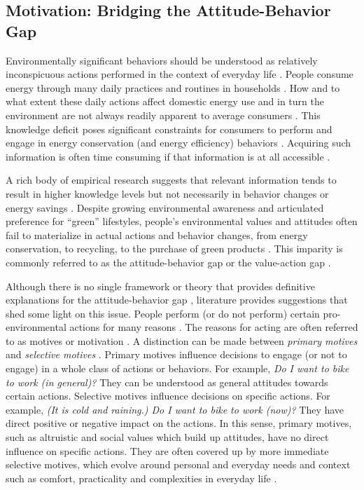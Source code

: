 \subsection{Motivation: Bridging the Attitude-Behavior Gap}

Environmentally significant behaviors should be understood as relatively inconspicuous actions performed in the context of everyday life \citep{Burgess2008}. People consume energy through many daily practices and routines in households \citep{Burgess2008,Hargreaves2010, Fehrenbacher2011,Burchell2014}. How and to what extent these daily actions affect domestic energy use and in turn the environment are not always readily apparent to average consumers  \citep{Burgess2008,Delmas2013}. This knowledge deficit poses significant constraints for consumers to perform and engage in energy conservation (and energy efficiency) behaviors \citep{Schultz2002,Burchell2014}. Acquiring such information is often time consuming if that information is at all accessible \citep{Delmas2013}. 

A rich body of empirical research suggests that relevant information tends to result in higher knowledge levels but not necessarily in behavior changes or energy savings  \citep{Abrahamse2005,Delmas2013,Burchell2014,Asensio2015}. Despite growing environmental awareness and articulated preference for ``green'' lifestyles, people's environmental values and attitudes often fail to materialize in actual actions and behavior changes, from energy conservation, to recycling,  to the purchase of green products  \citep{Schultz2002,Abrahamse2005,Claudy2013}. This imparity is commonly referred to as the attitude-behavior gap or the value-action gap  \citep{Blake1999,Kollmuss2002,Claudy2013}. 

Although there is no single framework or theory that provides definitive explanations for the attitude-behavior gap  \citep{Kollmuss2002,Schultz2014}, literature provides suggestions that shed some light on this issue. People perform (or do not perform) certain pro-environmental actions for many reasons  \citep{Schultz2002}. The reasons for acting are often referred to as motives or motivation  \citep{Parfit1997,Moisander2007}. A distinction can be made between \textit{primary motives} and \textit{selective motives}  \citep{Kollmuss2002,Moisander2007}. Primary motives influence decisions to engage (or not to engage) in a whole class of actions or behaviors. For example, \textit{Do I want to bike to work (in general)?} They can be understood as general attitudes towards certain actions. Selective motives influence decisions on specific actions. For example, \textit{(It is cold and raining.) Do I want to bike to work (now)?} They have direct positive or negative impact on the actions. In this sense, primary motives, such as altruistic and social values which build up attitudes, have no direct influence on specific actions. They are often covered up by more immediate selective motives, which evolve around personal and everyday needs and context such as comfort, practicality and complexities in everyday life  \citep{Kollmuss2002,Berthou2013,Selvefors2015}. 

